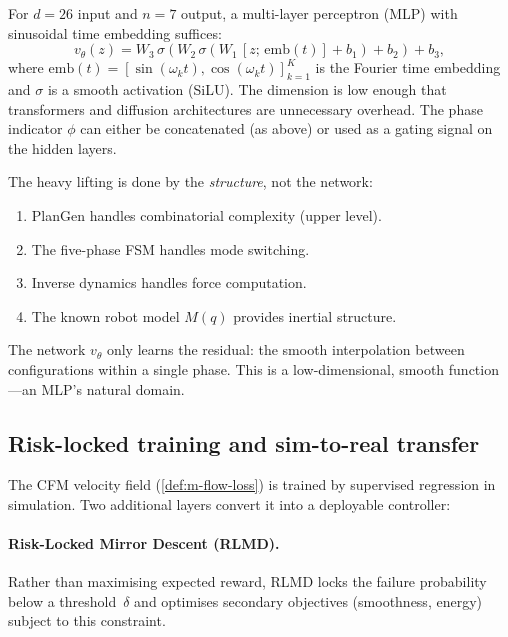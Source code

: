 \begin{remark}\label{rem:m-arch}
For $d = 26$ input and $n = 7$ output, a multi-layer perceptron
(MLP) with sinusoidal time embedding suffices:
\[
  v_\theta(z) = W_3\,\sigma(W_2\,\sigma(W_1\,[z;\,
  \mathrm{emb}(t)] + b_1) + b_2) + b_3,
\]
where $\mathrm{emb}(t) = [\sin(\omega_k t), \cos(\omega_k t)]_{k=1}^{K}$
is the Fourier time embedding and $\sigma$ is a smooth activation
(SiLU).  The dimension is low enough that transformers and
diffusion architectures are unnecessary overhead.  The phase
indicator $\phi$ can either be concatenated (as above) or used as
a gating signal on the hidden layers.
\end{remark}

\begin{remark}
\label{rem:m-minimal}
The heavy lifting is done by the \emph{structure}, not the network:
\begin{enumerate}[label=(\roman*),nosep]
  \item PlanGen handles combinatorial complexity (upper level).
  \item The five-phase FSM handles mode switching.
  \item Inverse dynamics handles force computation.
  \item The known robot model $M(q)$ provides inertial structure.
\end{enumerate}
The network $v_\theta$ only learns the residual: the smooth
interpolation between configurations within a single phase.
This is a low-dimensional, smooth function---an MLP's natural
domain.
\end{remark}

\subsection{Risk-locked training and sim-to-real transfer}
\label{sec:m-rlmd}

The CFM velocity field (\cref{def:m-flow-loss}) is trained by
supervised regression in simulation.  Two additional layers
convert it into a deployable controller:

\paragraph{Risk-Locked Mirror Descent (RLMD).}
Rather than maximising expected reward, RLMD locks the failure
probability below a threshold~$\delta$ and optimises secondary
objectives (smoothness, energy) subject to this constraint.


